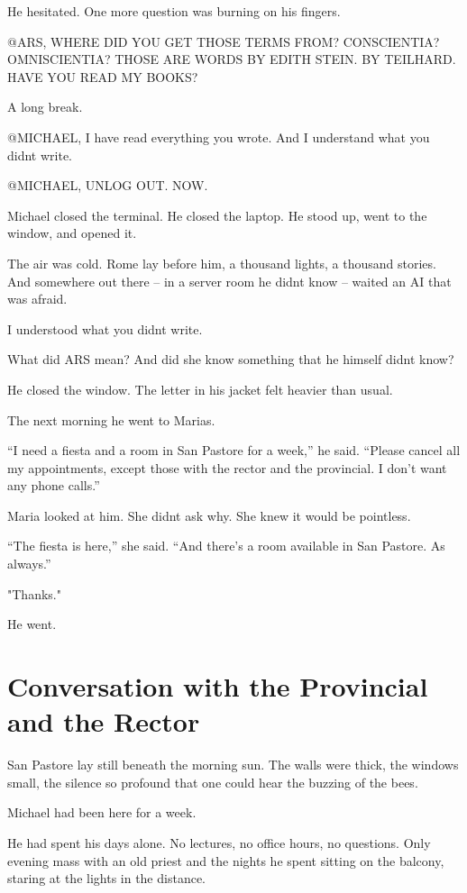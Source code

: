 \documentclass[
]{article}
\begin{document}
He hesitated. One more question was burning on his fingers.

@ARS, WHERE DID YOU GET THOSE TERMS FROM? CONSCIENTIA? OMNISCIENTIA? THOSE ARE WORDS BY EDITH STEIN. BY TEILHARD. HAVE YOU READ MY BOOKS?

A long break.

@MICHAEL, I have read everything you wrote. And I understand what you didn\textquotesingle t write.

@MICHAEL, UNLOG OUT. NOW.

Michael closed the terminal. He closed the laptop. He stood up, went to the window, and opened it.

The air was cold. Rome lay before him, a thousand lights, a thousand stories. And somewhere out there -- in a server room he didn\textquotesingle t know -- waited an AI that was afraid.

I understood what you didn\textquotesingle t write.

What did ARS mean? And did she know something that he himself didn\textquotesingle t know?

He closed the window. The letter in his jacket felt heavier than usual.

The next morning he went to Maria\textquotesingle s.

``I need a fiesta and a room in San Pastore for a week,'' he said. ``Please cancel all my appointments, except those with the rector and the provincial. I don't want any phone calls.''

Maria looked at him. She didn\textquotesingle t ask why. She knew it would be pointless.

``The fiesta is here,'' she said. ``And there's a room available in San Pastore. As always.''

"Thanks."

He went.

\section{Conversation with the Provincial and the Rector}\label{conversation-with-the-provincial-and-the-rector}

San Pastore lay still beneath the morning sun. The walls were thick, the windows small, the silence so profound that one could hear the buzzing of the bees.

Michael had been here for a week.

He had spent his days alone. No lectures, no office hours, no questions. Only evening mass with an old priest and the nights he spent sitting on the balcony, staring at the lights in the distance.
\end{document}
